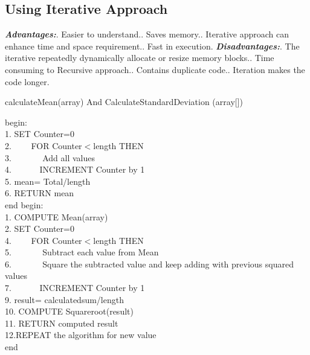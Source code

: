 \documentclass[a4paper,11pt]{article}
\begin{document}
\begin{titlepage}
\subsection{Using Iterative Approach}
\textbf{\textit{Advantages:}}. Easier to understand.. Saves memory.. Iterative approach can enhance time and space requirement.. Fast in execution.\newline
\textbf{\textit{Disadvantages:}}. The iterative repeatedly dynamically allocate or resize memory blocks.. Time consuming to Recursive approach.. Contains duplicate code.. Iteration makes the code longer.
\newpage
\begin{algorithm}
\caption{calculateMean(array) And CalculateStandardDeviation (array[])}
\label{Algorithm 1:}
begin: \\
1. SET Counter=0\\
2. $\hspace{2em}$FOR Counter$<$length THEN\\
3. $\hspace{3em}$ Add all values\\
4. $\hspace{3em}$INCREMENT Counter by 1 \\
5. mean= Total/length \\
6. RETURN mean\\
end\newline
begin: \\
1. COMPUTE Mean(array)\\
2. SET Counter=0\\
4. $\hspace{2em}$FOR Counter$<$length THEN\\
5. $\hspace{3em}$ Subtract each value from Mean\\
6. $\hspace{3em}$ Square the subtracted value and keep adding     with previous squared values\\
7. $\hspace{3em}$INCREMENT Counter by 1 \\
9. result= calculatedsum/length \\
10. COMPUTE Squareroot(result)\\
11. RETURN computed result \\
12.REPEAT the algorithm for new value  \\
end
\end{algorithm}

\end{titlepage}
\end{document}
